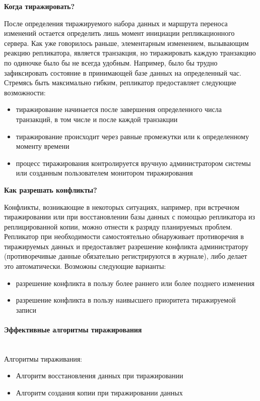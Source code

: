 \bigbreak
\textbf{Когда тиражировать?}

После определения тиражируемого набора данных и маршрута переноса изменений остается определить лишь момент инициации репликационного сервера. Как уже говорилось раньше, элементарным изменением, вызывающим реакцию репликатора, является транзакция, но тиражировать каждую транзакцию по одиночке было бы не всегда удобным. Например, было бы трудно зафиксировать состояние в принимающей базе данных на определенный час. Стремясь быть максимально гибким, репликатор предоставляет следующие возможности:

\begin{itemize}
    \item тиражирование начинается после завершения определенного числа транзакций, в том числе и после каждой транзакции
    \item тиражирование происходит через равные промежутки или к определенному моменту времени
    \item процесс тиражирования контролируется вручную администратором системы или созданным пользователем монитором тиражирования
\end{itemize}

\bigbreak
\textbf{Как разрешать конфликты?}

Конфликты, возникающие в некоторых ситуациях, например, при встречном тиражировании или при восстановлении базы данных с помощью репликатора из реплицированной копии, можно отнести к разряду планируемых проблем. Репликатор при необходимости самостоятельно обнаруживает противоречия в тиражируемых данных и предоставляет разрешение конфликта администратору (противоречивые данные обязательно регистрируются в журнале), либо делает это автоматически. Возможны следующие варианты:

\begin{itemize}
    \item разрешение конфликта в пользу более раннего или более позднего изменения
    \item разрешение конфликта в пользу наивысшего приоритета тиражируемой записи
\end{itemize}

\paragraph{Эффективные алгоритмы тиражирования}~\\

Алгоритмы тираживания:
\begin{itemize}
    \item Алгоритм восстановления данных при тиражировании
    \item Алгоритм создания копии при тиражировании данных
\end{itemize}

